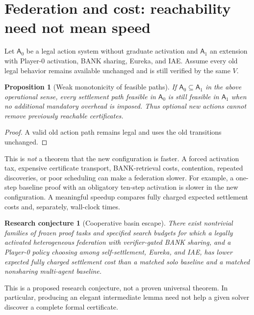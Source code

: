 \documentclass[11pt,letterpaper]{article}
\newtheorem{proposition}[definition]{Proposition}
\newtheorem{conjecture}[definition]{Research conjecture}
\begin{document}
\section{Federation and cost: reachability need not mean speed}
Let $\mathsf{A}_0$ be a legal action system without graduate activation and $\mathsf{A}_1$ an extension with Player-0 activation, BANK sharing, Eureka, and IAE. Assume every old legal behavior remains available unchanged and is still verified by the same $V$.

\begin{proposition}[Weak monotonicity of feasible paths]
If $\mathsf{A}_0\subseteq\mathsf{A}_1$ in the above operational sense, every settlement path feasible in $\mathsf{A}_0$ is still feasible in $\mathsf{A}_1$ \emph{when no additional mandatory overhead is imposed}. Thus optional new actions cannot remove previously reachable certificates.
\end{proposition}
\begin{proof} A valid old action path remains legal and uses the old transitions unchanged.\end{proof}

This is \emph{not} a theorem that the new configuration is faster. A forced activation tax, expensive certificate transport, BANK-retrieval costs, contention, repeated discoveries, or poor scheduling can make a federation slower. For example, a one-step baseline proof with an obligatory ten-step activation is slower in the new configuration. A meaningful speedup compares fully charged expected settlement costs and, separately, wall-clock times.

\begin{conjecture}[Cooperative basin escape]
There exist nontrivial families of frozen proof tasks and specified search budgets for which a legally activated heterogeneous federation with verifier-gated BANK sharing, and a Player-0 policy choosing among self-settlement, Eureka, and IAE, has lower expected \emph{fully charged} settlement cost than a matched solo baseline and a matched nonsharing multi-agent baseline.
\end{conjecture}
This is a proposed research conjecture, not a proven universal theorem. In particular, producing an elegant intermediate lemma need not help a given solver discover a complete formal certificate.
\end{document}
